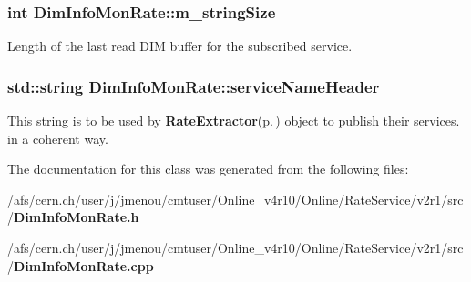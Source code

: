 \subsubsection{\setlength{\rightskip}{0pt plus 5cm}int {\bf Dim\-Info\-Mon\-Rate::m\_\-string\-Size}\hspace{0.3cm}{\tt  [private]}}\label{classDimInfoMonRate_r8}


Length of the last read DIM buffer for the subscribed service.
\subsubsection{\setlength{\rightskip}{0pt plus 5cm}std::string {\bf Dim\-Info\-Mon\-Rate::service\-Name\-Header}\hspace{0.3cm}{\tt  [private]}}\label{classDimInfoMonRate_r11}


This string is to be used by {\bf Rate\-Extractor}{\rm (p.\,\pageref{classRateExtractor})} object to publish their services. in a coherent way.

The documentation for this class was generated from the following files:\begin{CompactItemize}
\item 
/afs/cern.ch/user/j/jmenou/cmtuser/Online\_\-v4r10/Online/Rate\-Service/v2r1/src/{\bf Dim\-Info\-Mon\-Rate.h}\item 
/afs/cern.ch/user/j/jmenou/cmtuser/Online\_\-v4r10/Online/Rate\-Service/v2r1/src/{\bf Dim\-Info\-Mon\-Rate.cpp}\end{CompactItemize}
